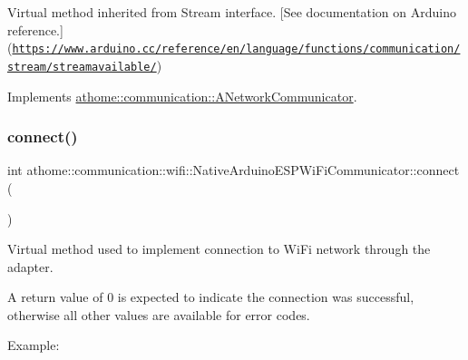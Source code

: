 Virtual method inherited from Stream interface. \mbox{[}See documentation on Arduino reference.\mbox{]}(\href{https://www.arduino.cc/reference/en/language/functions/communication/stream/streamavailable/}{\tt https\+://www.\+arduino.\+cc/reference/en/language/functions/communication/stream/streamavailable/}) 

Implements \mbox{\hyperlink{classathome_1_1communication_1_1_a_network_communicator_a2bf367d03c98e8523fda71dd43ffa2fb}{athome\+::communication\+::\+A\+Network\+Communicator}}.

\mbox{\label{classathome_1_1communication_1_1wifi_1_1_native_arduino_e_s_p_wi_fi_communicator_abc07f2d953fa91f86b8919858e10bbd7}} 
\subsubsection{\texorpdfstring{connect()}{connect()}}
{\footnotesize\ttfamily int athome\+::communication\+::wifi\+::\+Native\+Arduino\+E\+S\+P\+Wi\+Fi\+Communicator\+::connect (\begin{DoxyParamCaption}{ }\end{DoxyParamCaption})\hspace{0.3cm}{\ttfamily [virtual]}}

Virtual method used to implement connection to Wi\+Fi network through the adapter.

A return value of 0 is expected to indicate the connection was successful, otherwise all other values are available for error codes.

Example\+:


